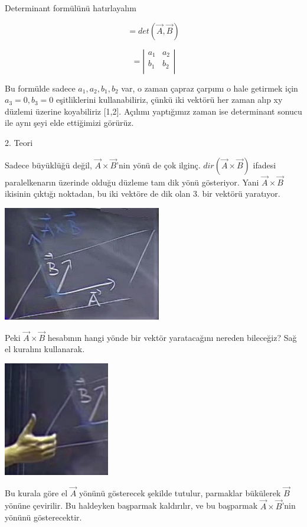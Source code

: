 \documentclass[12pt,fleqn]{article}\usepackage{../../common}
\begin{document}
Determinant formülünü hatırlayalım

$$ = det(\vec{A},\vec{B}) $$

$$ =
\left|\begin{array}{rr}
a_1 & a_2 \\
b_1 & b_2 \\
\end{array}\right|
 $$

Bu formülde sadece $a_1,a_2,b_1,b_2$ var, o zaman çapraz çarpımı o hale getirmek
için $a_3=0,b_3=0$ eşitliklerini kullanabiliriz, çünkü iki vektörü her zaman
alıp xy düzlemi üzerine koyabiliriz [1,2]. Açılımı yaptığımız zaman ise
determinant sonucu ile aynı şeyi elde ettiğimizi görürüz.

2. Teori

Sadece büyüklüğü değil, $\vec{A} \times \vec{B}$'nin yönü de çok
ilginç. $dir(\vec{A} \times \vec{B})$ ifadesi paralelkenarın üzerinde olduğu
düzleme tam dik yönü gösteriyor. Yani $\vec{A} \times \vec{B}$ ikisinin çıktığı
noktadan, bu iki vektöre de dik olan 3. bir vektörü yaratıyor.

\includegraphics[height=5cm]{2_10.png}

Peki $\vec{A} \times \vec{B}$ hesabının hangi yönde bir vektör yaratacağını
nereden bileceğiz? Sağ el kuralını kullanarak.

\includegraphics[height=5cm]{2_11.png}

Bu kurala göre el $\vec{A}$ yönünü gösterecek şekilde tutulur, parmaklar
bükülerek $\vec{B}$ yönüne çevirilir. Bu haldeyken başparmak kaldırılır, ve bu
başparmak $\vec{A} \times \vec{B}$'nin yönünü gösterecektir.
\end{document}
